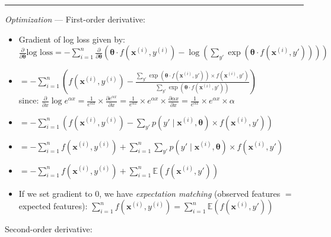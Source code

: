 {\color{lightgray}\hrule height 0.001mm}

\emph{Optimization} ---
First-order derivative:
\begin{itemize}
    \item Gradient of log loss given by:
    $
    \frac{\partial}{\partial \boldsymbol{\theta}} \textrm{log loss} = -\sum_{i=1}^n \frac{\partial}{\partial \boldsymbol{\theta}} ( \boldsymbol{\theta} \cdot f(\boldsymbol{x}^{(i)}, y^{(i)}) - \log(\sum_{y'} \exp(\boldsymbol{\theta} \cdot f(\boldsymbol{x}^{(i)}, y'))))
    $
    \item $
    = -\sum_{i=1}^n ( f(\boldsymbol{x}^{(i)}, y^{(i)}) - \frac{\sum_{y'} \exp(\boldsymbol{\theta} \cdot f(\boldsymbol{x}^{(i)}, y')) \times f(\boldsymbol{x}^{(i)}, y')}{\sum_{y'} \exp(\boldsymbol{\theta} \cdot f(\boldsymbol{x}^{(i)}, y'))} )
    $\\
    since:
    $\frac{\partial}{\partial x} \log{e^{\alpha x}} = \frac{1}{e^{\alpha x}} \times \frac{\partial e^{\alpha x}}{\partial x} = \frac{1}{e^{\alpha x}} \times e^{\alpha x} \times \frac{\partial \alpha x}{\partial x} = \frac{1}{e^{\alpha x}} \times e^{\alpha x} \times \alpha$
    \item $
    = - \sum_{i=1}^n ( f(\boldsymbol{x}^{(i)}, y^{(i)}) - \sum_{y'} p(y' \mid \boldsymbol{x}^{(i)}, \boldsymbol{\theta}) \times f(\boldsymbol{x}^{(i)}, y') )
    $
    \item $
    = - \sum_{i=1}^n f(\boldsymbol{x}^{(i)}, y^{(i)}) + \sum_{i=1}^n \sum_{y'} p(y' \mid \boldsymbol{x}^{(i)}, \boldsymbol{\theta}) \times f(\boldsymbol{x}^{(i)}, y')
    $
    \item $
    = - \sum_{i=1}^n f(\boldsymbol{x}^{(i)}, y^{(i)}) + \sum_{i=1}^n \mathbb{E}(f(\boldsymbol{x}^{(i)}, y'))
    $
    \item If we set gradient to 0, we have \emph{expectation matching} (observed features $=$ expected features): $\sum_{i=1}^n f(\boldsymbol{x}^{(i)}, y^{(i)}) = \sum_{i=1}^n \mathbb{E}(f(\boldsymbol{x}^{(i)}, y'))$
\end{itemize}
Second-order derivative:
